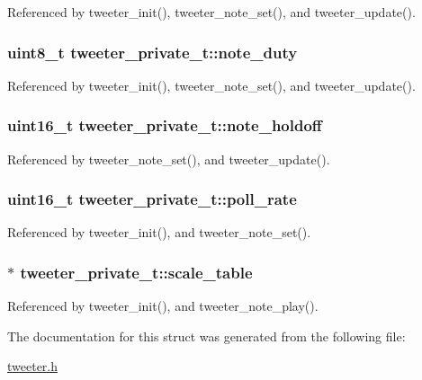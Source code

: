 Referenced by tweeter\_\-init(), tweeter\_\-note\_\-set(), and tweeter\_\-update().\hypertarget{structtweeter__private__t_77716ab615ed0b7329eed4a34954909c}{
\subsubsection{\setlength{\rightskip}{0pt plus 5cm}uint8\_\-t {\bf tweeter\_\-private\_\-t::note\_\-duty}}}
\label{structtweeter__private__t_77716ab615ed0b7329eed4a34954909c}




Referenced by tweeter\_\-init(), tweeter\_\-note\_\-set(), and tweeter\_\-update().\hypertarget{structtweeter__private__t_ceca772041b6209a767e344be8199fee}{
\subsubsection{\setlength{\rightskip}{0pt plus 5cm}uint16\_\-t {\bf tweeter\_\-private\_\-t::note\_\-holdoff}}}
\label{structtweeter__private__t_ceca772041b6209a767e344be8199fee}




Referenced by tweeter\_\-note\_\-set(), and tweeter\_\-update().\hypertarget{structtweeter__private__t_75cdc2f5578d5afb3d344857141a0365}{
\subsubsection{\setlength{\rightskip}{0pt plus 5cm}uint16\_\-t {\bf tweeter\_\-private\_\-t::poll\_\-rate}}}
\label{structtweeter__private__t_75cdc2f5578d5afb3d344857141a0365}




Referenced by tweeter\_\-init(), and tweeter\_\-note\_\-set().\hypertarget{structtweeter__private__t_f64d174bb3290138155e8278d5d6ec1e}{
\subsubsection{$\ast$ {\bf tweeter\_\-private\_\-t::scale\_\-table}}}
\label{structtweeter__private__t_f64d174bb3290138155e8278d5d6ec1e}




Referenced by tweeter\_\-init(), and tweeter\_\-note\_\-play().

The documentation for this struct was generated from the following file:\begin{CompactItemize}
\item 
\hyperlink{tweeter_8h}{tweeter.h}\end{CompactItemize}
